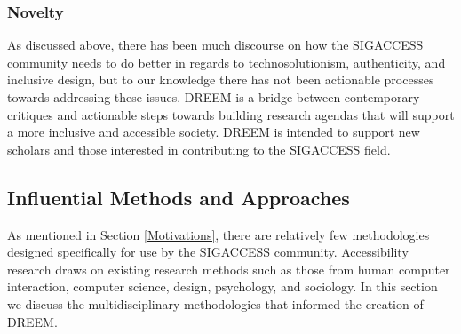 
\subsubsection{Novelty}
As discussed above, there has been much discourse on how the SIGACCESS community needs to do better in regards to technosolutionism, authenticity, and inclusive design, but to our knowledge there has not been actionable processes towards addressing these issues. DREEM is a bridge between contemporary critiques and actionable steps towards building research agendas that will support a more inclusive and accessible society. DREEM is intended to support new scholars and those interested in contributing to the SIGACCESS field.
			
\subsection{Influential Methods and Approaches}\label{influences}
As mentioned in Section \ref{Motivations}, there are relatively few methodologies designed specifically for use by the SIGACCESS community. Accessibility research draws on existing research methods such as those from human computer interaction, computer science, design, psychology, and sociology. In this section we discuss the multidisciplinary methodologies that informed the creation of DREEM. 

